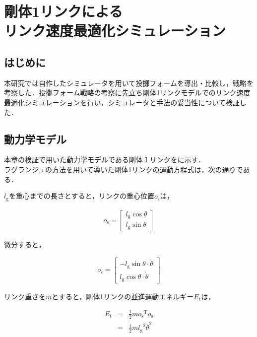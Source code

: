 \chapter[剛体1リンクによるリンク速度最適化シミュレーション]{剛体1リンクによる\\リンク速度最適化シミュレーション}

\section{はじめに}
本研究では自作したシミュレータを用いて投擲フォームを導出・比較し，戦略を考察した．投擲フォーム戦略の考察に先立ち剛体1リンクモデルでのリンク速度最適化シミュレーションを行い，シミュレータと手法の妥当性について検証した．
\section{動力学モデル}
本章の検証で用いた動力学モデルである剛体１リンクをに示す．\\
ラグランジュの方法\cite{lagrange}を用いて導いた剛体1リンクの運動方程式は，次の通りである．\\

$l_{\mathrm{g}}$を重心までの長さとすると，リンクの重心位置$o_{\mathrm{s}}$は，

\begin{eqnarray}
  o_{\mathrm{s}} = 
              \begin{bmatrix}
              l_{\mathrm{g}}\cos\theta\\
              l_{\mathrm{g}}\sin\theta
              \end{bmatrix}
\end{eqnarray}

微分すると，

\begin{eqnarray}
  o_{\mathrm{\dot{s}}} = 
              \begin{bmatrix}
              -l_{\mathrm{g}}\sin\theta \cdot \dot{\theta}\\
              l_{\mathrm{g}}\cos\theta \cdot \dot{\theta}
              \end{bmatrix}
\end{eqnarray}

リンク重さを$m$とすると，剛体1リンクの並進運動エネルギー$E_{\mathrm{t}}$は，

\begin{eqnarray}
  E_{\mathrm{t}} 
  &=&\frac{1}{2}mo_{\mathrm{\dot{s}}}{}^\mathrm{T}\!o_{\mathrm{\dot{s}}} \nonumber \\
  &=&\frac{1}{2}m{l_{\mathrm{g}}}^2{\dot{\theta}}^2
\end{eqnarray}

